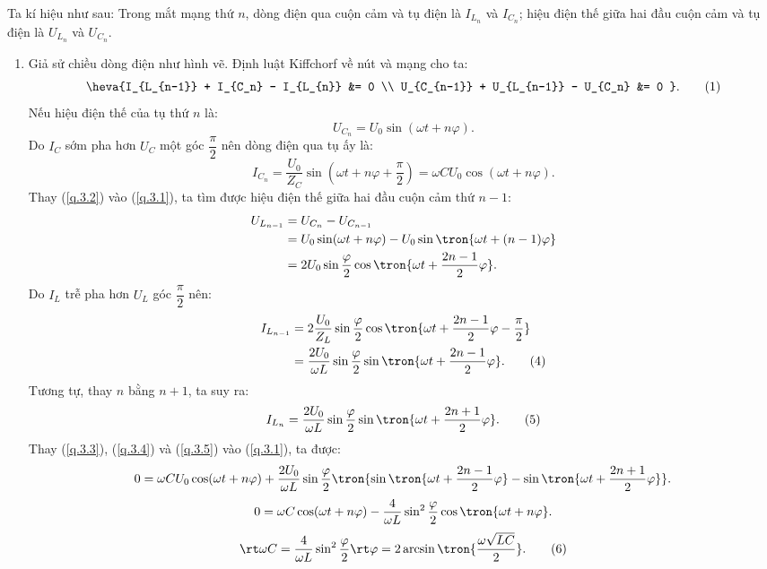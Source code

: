 \begin{loigiai}\[\]
Ta kí hiệu như sau: Trong mắt mạng thứ $n$, dòng điện qua cuộn cảm  và tụ điện là $I_{L_n}$ và $I_{C_n}$; hiệu điện thế giữa hai đầu cuộn cảm và tụ điện là $U_{L_n}$ và $U_{C_n}$.
\begin{enumerate}[1)]
    \item Giả sử chiều dòng điện như hình vẽ. Định luật Kiffchorf về nút và mạng cho ta:
    \[\heva{I_{L_{n-1}} + I_{C_n} - I_{L_{n}} &= 0 \\
    U_{C_{n-1}} + U_{L_{n-1}} - U_{C_n} &= 0 }. \tag{1} \label{q.3.1}\]
    Nếu hiệu điện thế của tụ thứ $n$ là:
    \[U_{C_n} =  U_0 \sin (\omega t + n \varphi). \tag{2} \label{q.3.2}\]
    Do $I_{C}$ sớm pha hơn $U_{C}$ một góc $\dfrac{\pi}{2}$ nên dòng điện qua tụ ấy là:
    \[I_{C_n} = \dfrac{U_0}{Z_C} \sin (\omega t + n \varphi  + \dfrac{\pi}{2}) = \omega C U_0 \cos  (\omega t + n \varphi). \tag{3} \label{q.3.3}\]
    Thay (\ref{q.3.2}) vào (\ref{q.3.1}), ta tìm được hiệu điện thế giữa hai đầu cuộn cảm thứ $n - 1$:
    \begin{align*}
        U_{L_{n-1}} &= U_{C_n} - U_{C_{n-1}} \\
        &=  U_0 \sin (\omega t + n \varphi) - U_0 \sin \tron{\omega t + (n-1) \varphi}\\
        &= 2U_0 \sin \dfrac{\varphi}{2} \cos \tron{\omega t + \dfrac{2n-1}{2} \varphi}.
    \end{align*}
    Do $I_L$ trễ pha hơn $U_L$ góc $\dfrac{\pi}{2}$ nên:
    \begin{align*}
        I_{L_{n-1}} &= 2 \dfrac{U_0}{Z_L} \sin \dfrac{\varphi}{2} \cos \tron{\omega t + \dfrac{2n-1}{2} \varphi - \dfrac{\pi}{2}}\\
        &= \dfrac{2U_0}{\omega L}\sin \dfrac{\varphi}{2} \sin \tron{\omega t + \dfrac{2n-1}{2} \varphi}. \tag{4} \label{q.3.4}
    \end{align*}
    Tương tự, thay $n$ bằng $n+1$, ta suy ra:
    \[I_{L_n} = \dfrac{2U_0}{\omega L}\sin \dfrac{\varphi}{2} \sin \tron{\omega t + \dfrac{2n+1}{2} \varphi}. \tag{5} \label{q.3.5}\]
    Thay (\ref{q.3.3}), (\ref{q.3.4}) và (\ref{q.3.5}) vào (\ref{q.3.1}), ta được:
    \[0 = \omega C U_0 \cos  (\omega t + n \varphi) + \dfrac{2U_0}{\omega L}\sin \dfrac{\varphi}{2} \tron{\sin \tron{\omega t + \dfrac{2n-1}{2} \varphi} - \sin \tron{\omega t + \dfrac{2n+1}{2} \varphi}}. \]
    \[0 = \omega C \cos  (\omega t + n \varphi) - \dfrac{4}{\omega L} \sin^2 \dfrac{\varphi}{2}\cos \tron{\omega t + n \varphi}. \]
    \[\rt \omega C = \dfrac{4}{\omega L}\sin^2 \dfrac{\varphi}{2} \rt \varphi = 2\arcsin \tron{\dfrac{\omega\sqrt{LC}}{2}}. \tag{6}\label{q.3.6}\]

\end{enumerate}
\end{loigiai}
